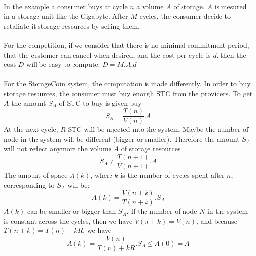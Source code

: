 \documentclass[a4paper,12pt]{article}
\begin{document}
\paragraph*{}
In the example a consumer buys at cycle $n$ a volume $A$ of storage. $A$ is mesured in a storage unit like the Gigabyte. After $M$ cycles, the consumer decide to retaliate it storage resources by selling them.

\paragraph*{}
For the competition, if we consider that there is no minimal commitment period, that the customer can cancel when desired, and the cost per cycle is $d$, then the cost $D$ will be easy to compute: $D=M.A.d$

\paragraph*{}
For the StorageCoin system, the computation is made differently. In order to buy storage resources, the consumer must buy enough STC from the providers.
To get $A$ the amount $S_{A}$ of STC to buy is given buy 
\[S_{A}=\frac{T(n)}{V(n)}.A\]
At the next cycle, $R$ STC will be injected into the system. Maybe the number of node in the system will be different (bigger or smaller). 
Therefore the amount $S_{A}$ will not reflect anymore the volume $A$ of storage resources 
\[S_{A}\neq \frac{T(n+1)}{V(n+1)}.A\]
The amount of space $A(k)$, where $k$ is the number of cycles spent after $n$, corresponding to $S_{A}$ will be: 
\[A(k)=\frac{V(n+k)}{T(n+k)}.S_{A}\]
$A(k)$ can be smaller or bigger than $S_{A}$. If the number of node $N$ in the system is constant across the cycles, then we have $V(n+k)=V(n)$, and because $T(n+k)=T(n)+kR$, we have
\[A(k)=\frac{V(n)}{T(n)+kR}.S_{A}\le A(0)=A\]
\end{document}
